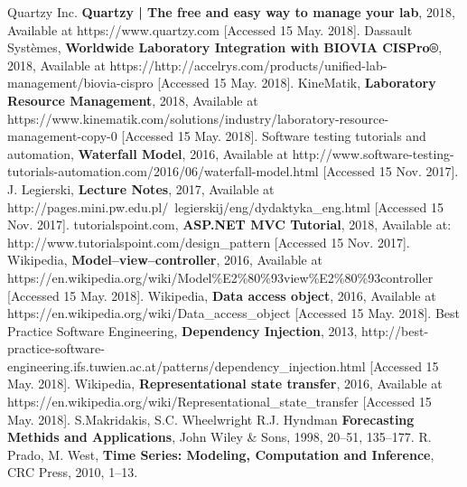 \documentclass[a4paper,11pt,twoside]{report}
\theoremstyle{definition}
\begin{document}
\begin{thebibliography}{20} %
 Quartzy Inc. \textbf{Quartzy | The free and easy way to manage your lab}, 2018, Available at https://www.quartzy.com [Accessed 15 May. 2018].
 Dassault Systèmes,  \textbf{Worldwide Laboratory Integration with BIOVIA CISPro®}, 2018, Available at https://http://accelrys.com/products/unified-lab-management/biovia-cispro [Accessed 15 May. 2018].
 KineMatik,  \textbf{Laboratory Resource Management}, 2018, Available at https://www.kinematik.com/solutions/industry/laboratory-resource-management-copy-0 [Accessed 15 May. 2018].
 Software testing tutorials and automation,  \textbf{Waterfall Model}, 2016, Available at http://www.software-testing-tutorials-automation.com/2016/06/waterfall-model.html [Accessed 15 Nov. 2017].
 J. Legierski, \textbf{Lecture Notes}, 2017, Available at http://pages.mini.pw.edu.pl/~legierskij/eng/dydaktyka\_eng.html [Accessed 15 Nov. 2017].
 tutorialspoint.com, \textbf{ASP.NET MVC Tutorial}, 2018, Available at: http://www.tutorialspoint.com/design\_pattern [Accessed 15 Nov. 2017].
 Wikipedia, \textbf{Model–view–controller}, 2016, Available at https://en.wikipedia.org/wiki/Model\%E2\%80\%93view\%E2\%80\%93controller [Accessed 15 May. 2018].
 Wikipedia, \textbf{Data access object}, 2016, Available at https://en.wikipedia.org/wiki/Data\_access\_object [Accessed 15 May. 2018].
 Best Practice Software Engineering, \textbf{Dependency Injection}, 2013, http://best-practice-software-engineering.ifs.tuwien.ac.at/patterns/dependency\_injection.html [Accessed 15 May. 2018].
 Wikipedia, \textbf{Representational state transfer}, 2016, Available at https://en.wikipedia.org/wiki/Representational\_state\_transfer [Accessed 15 May. 2018].
 S.Makridakis, S.C. Wheelwright R.J. Hyndman \textbf{Forecasting Methids and Applications}, John Wiley \& Sons, 1998, 20--51, 135--177.
 R. Prado, M. West,  \textbf{Time Series: Modeling, Computation and Inference}, CRC Press, 2010, 1--13.


\end{thebibliography}
\thispagestyle{empty}



\end{document}
